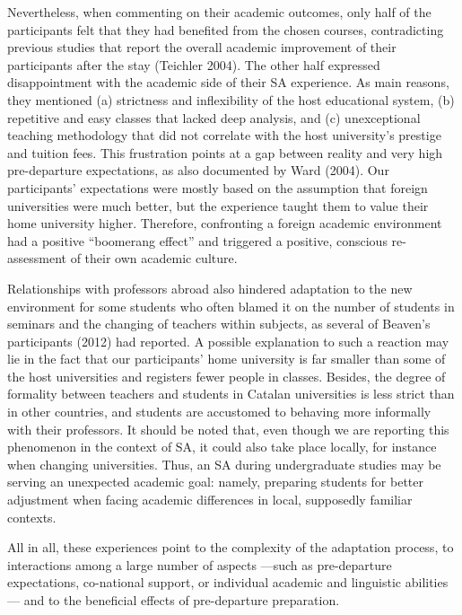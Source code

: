 \documentclass[12pt]{article}
\newenvironment{styleStandard}{\setlength\leftskip{0cm}\setlength\rightskip{0cm plus 1fil}\setlength\parindent{0cm}\setlength\parfillskip{0pt plus 1fil}\setlength\parskip{0in plus 1pt}\writerlistparindent\writerlistleftskip\leavevmode\normalfont\normalsize\writerlistlabel\ignorespaces}{\unskip\vspace{0.111in plus 0.0111in}\par}
\newcommand\writerlistleftskip{}
\newcommand\writerlistparindent{}
\newcommand\writerlistlabel{}
\begin{document}
\begin{styleStandard}
Nevertheless, when commenting on their academic outcomes, only half of the participants felt that they had benefited from the chosen courses, contradicting previous studies that report the overall academic improvement of their participants after the stay (Teichler 2004). The other half expressed disappointment with the academic side of their SA experience. As main reasons, they mentioned (a) strictness and inflexibility of the host educational system, (b) repetitive and easy classes that lacked deep analysis, and (c) unexceptional teaching methodology that did not correlate with the host university’s prestige and tuition fees. This frustration points at a gap between reality and very high pre-departure expectations, as also documented by Ward (2004). Our participants’ expectations were mostly based on the assumption that foreign universities were much better, but the experience taught them to value their home university higher. Therefore, confronting a foreign academic environment had a positive “boomerang effect” and triggered a positive, conscious re-assessment of their own academic culture.
\end{styleStandard}

\begin{styleStandard}
Relationships with professors abroad also hindered adaptation to the new environment for some students who often blamed it on the number of students in seminars and the changing of teachers within subjects, as several of Beaven’s participants (2012) had reported. A possible explanation to such a reaction may lie in the fact that our participants’ home university is far smaller than some of the host universities and registers fewer people in classes. Besides, the degree of formality between teachers and students in Catalan universities is less strict than in other countries, and students are accustomed to behaving more informally with their professors. It should be noted that, even though we are reporting this phenomenon in the context of SA, it could also take place locally, for instance when changing universities. Thus, an SA during undergraduate studies may be serving an unexpected academic goal: namely, preparing students for better adjustment when facing academic differences in local, supposedly familiar contexts.
\end{styleStandard}

\begin{styleStandard}
All in all, these experiences point to the complexity of the adaptation process, to interactions among a large number of aspects —such as pre-departure expectations, co-national support, or individual academic and linguistic abilities— and to the beneficial effects of pre-departure preparation. 
\end{styleStandard}
\end{document}
